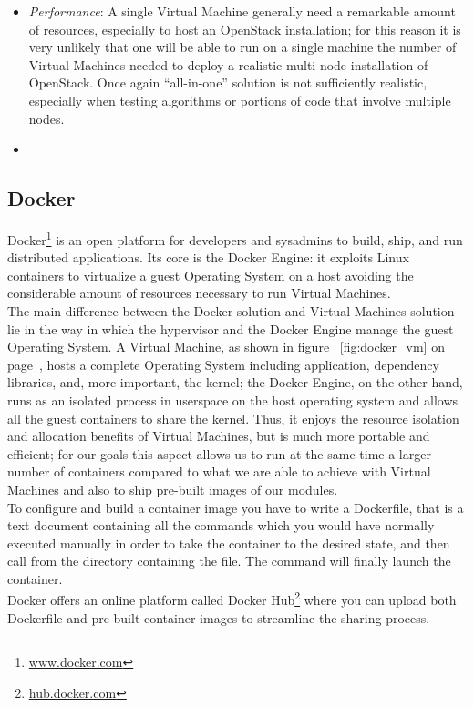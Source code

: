 \begin{itemize}
\item \textit{Performance}: A single Virtual Machine generally need a remarkable amount of resources, especially to host an OpenStack installation; for this reason it is very unlikely that one will be able to run on a single machine the number of Virtual Machines needed to deploy a realistic multi-node installation of OpenStack. Once again ``all-in-one'' solution is not sufficiently realistic, especially when testing algorithms or portions of code that involve multiple nodes.
\item {}
\end{itemize}


\subsection{Docker}
\label{sub:sota_docker}
Docker\footnote{\url{www.docker.com}} is an open platform for developers and sysadmins to build, ship, and run distributed applications. Its core is the Docker Engine: it exploits Linux containers to virtualize a guest Operating System on a host avoiding the considerable amount of resources necessary to run Virtual Machines.\\
The main difference between the Docker solution and Virtual Machines solution lie in the way in which the hypervisor and the Docker Engine manage the guest Operating System. A Virtual Machine, as shown in figure ~\ref{fig:docker_vm} on page~\pageref{fig:docker_vm}, hosts a complete Operating System including application, dependency libraries, and, more important, the kernel; the Docker Engine, on the other hand, runs as an isolated process in userspace on the host operating system and allows all the guest containers to share the kernel. Thus, it enjoys the resource isolation and allocation benefits of Virtual Machines, but is much more portable and efficient; for our goals this aspect allows us to run at the same time a larger number of containers compared to what we are able to achieve with Virtual Machines and also to ship pre-built images of our modules.\\
To configure and build a container image you have to write a Dockerfile, that is a text document containing all the commands which you would have normally executed manually in order to take the container to the desired state, and then call  from the directory containing the file. The command  will finally launch the container.\\
Docker offers an online platform called Docker Hub\footnote{\url{hub.docker.com}} where you can upload both Dockerfile and pre-built container images to streamline the sharing process.
    
